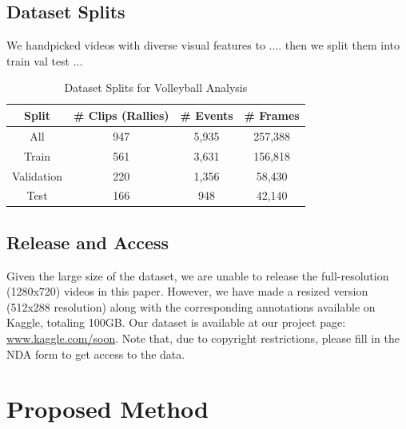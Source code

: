 \documentclass[conference]{IEEEtran}
\begin{document}
\subsection{Dataset Splits}
We handpicked videos with diverse visual features to ....
then we split them into train val test ...


\begin{table}[htbp]
    \caption{Dataset Splits for Volleyball Analysis}
    \begin{center}
    \begin{tabular}{|c|c|c|c|}
    \hline
    \textbf{Split} & \textbf{\# Clips (Rallies)} & \textbf{\# Events} & \textbf{\# Frames} \\
    \hline
    All & 947 & 5,935 & 257,388 \\
    Train & 561 & 3,631 & 156,818 \\
    Validation & 220 & 1,356 & 58,430 \\
    Test & 166 & 948 & 42,140 \\
    \hline
    \end{tabular}
    \label{tab-kovo-split}
    \end{center}
    \end{table}
\subsection{Release and Access}
Given the large size of the dataset, we are unable to release the full-resolution (1280x720) videos in this paper. However, we have made a resized version (512x288 resolution) along with the corresponding annotations available on Kaggle, totaling 100GB. Our dataset is available at our project page: \url{www.kaggle.com/soon}. Note that, due to copyright restrictions, please fill in the NDA form to get access to the data.
    

\section{Proposed Method}
\end{document}
